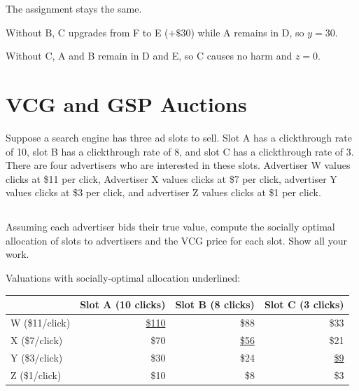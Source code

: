 \documentclass[newpages]{assignment}
\begin{document}
The assignment stays the same.

Without B, C upgrades from F to E ($+\$30$) while A remains in D, so $y=30$.

Without C, A and B remain in D and E, so C causes no harm and $z=0$.

\section{VCG and GSP Auctions}

\begin{problem}
    Suppose a search engine has three ad slots to sell. Slot A has a clickthrough rate of 10, slot B has a clickthrough rate of 8, and slot C has a clickthrough rate of 3. There are four advertisers who are interested in these slots. Advertiser W values clicks at \$11 per click, Advertiser X values clicks at \$7 per click, advertiser Y values clicks at \$3 per click, and advertiser Z values clicks at \$1 per click.
\end{problem}

\subsection{}
\begin{problem}
    Assuming each advertiser bids their true value, compute the socially optimal allocation of slots to advertisers and the VCG price for each slot. Show all your work.
\end{problem}

Valuations with socially-optimal allocation underlined:

\begin{center}
    \begin{tabular}{lrrr}
        \toprule
                       & Slot A (10 clicks) & Slot B (8 clicks) & Slot C (3 clicks) \\
        \midrule
        W (\$11/click) & \underline{\$110}  & \$88              & \$33              \\
        X (\$7/click)  & \$70               & \underline{\$56}  & \$21              \\
        Y (\$3/click)  & \$30               & \$24              & \underline{\$9}   \\
        Z (\$1/click)  & \$10               & \$8               & \$3               \\
        \bottomrule
    \end{tabular}
\end{center}
\end{document}
